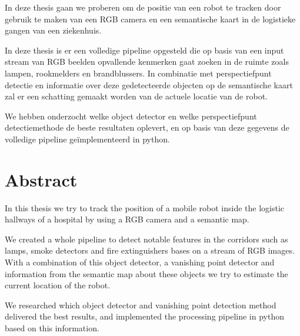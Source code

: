 In deze thesis gaan we proberen om de positie van een robot te tracken door gebruik te maken van een RGB camera en een semantische kaart
in de logistieke gangen van een ziekenhuis.

In deze thesis is er een volledige pipeline opgesteld die op basis van een input stream van RGB beelden opvallende kenmerken
gaat zoeken in de ruimte zoals lampen, rookmelders en brandblussers.
In combinatie met perspectiefpunt detectie en informatie over deze gedetecteerde objecten op de semantische kaart zal er een
schatting gemaakt worden van de actuele locatie van de robot.

We hebben onderzocht welke object detector en welke perspectiefpunt detectiemethode de beste resultaten oplevert, en op basis van
deze gegevens de volledige pipeline ge\"{i}mplementeerd in python.


\pagebreak
\chapter*{Abstract}

In this thesis we try to track the position of a mobile robot inside the logistic hallways of a hospital by using a RGB camera and a semantic map.

We created a whole pipeline to detect notable features in the corridors such as lamps, smoke detectors and fire extinguishers bases on a stream of RGB images.
With a combination of this object detector, a vanishing point detector and information from the semantic map about these objects we try to estimate
the current location of the robot.

We researched which object detector and vanishing point detection method delivered the best results, and implemented the processing pipeline
in python based on this information.